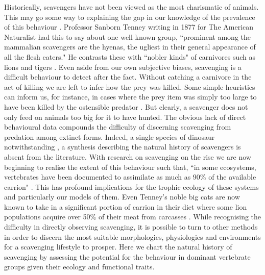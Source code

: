 \documentclass[a4paper,12pt]{article}
\begin{document}
Historically, scavengers have not been viewed as the most charismatic of animals.
This may go some way to explaining the gap in our knowledge of the prevalence of this behaviour \citep{devault2003scavenging}.
Professor Sanborn Tenney writing in 1877 for The American Naturalist had this to say about one well known group, ``prominent among the mammalian scavengers are the hyenas, the ugliest in their general appearance of all the flesh eaters."
He contrasts these with ``nobler kinds" of carnivores such as lions and tigers \citep{tenney1877few}.
Even aside from our own subjective biases, scavenging is a difficult behaviour to detect after the fact.
Without catching a carnivore in the act of killing we are left to infer how the prey was killed.
Some simple heuristics can inform us, for instance, in cases where the prey item was simply too large to have been killed by the ostensible predator \citep{pobiner2008paleoecological}.
But clearly, a scavenger does not only feed on animals too big for it to have hunted.
The obvious lack of direct behavioural data compounds the difficulty of discerning scavenging from predation among extinct forms.
Indeed, a single species of dinosaur notwithstanding \citep{carbone2011intra}, a synthesis describing the natural history of scavengers is absent from the literature.
With research on scavenging on the rise \citep{manga2006vulture} we are now beginning to realise the extent of this behaviour such that, ``in some ecosystems, vertebrates have been documented to assimilate as much as 90\% of the available carrion" \citep{beasley2015vertebrates}.
This has profound implications for the trophic ecology of these systems and particularly our models of them.
Even Tenney’s noble big cats are now known to take in a significant portion of carrion in their diet where some lion populations acquire over 50\% of their meat from carcasses \citep{jones2015african}.
While recognising the difficulty in directly observing scavenging, it is possible to turn to other methods in order to discern the most suitable morphologies, physiologies and environments for a scavenging lifestyle to prosper.
Here we chart the natural history of scavenging by assessing the potential for the behaviour in dominant vertebrate groups given their ecology and functional traits.

\end{document}
